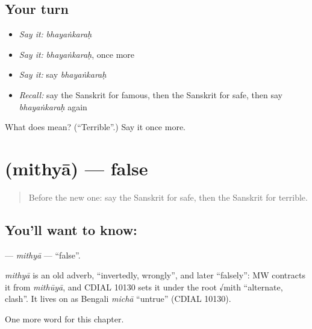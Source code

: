 \subsection*{Your turn}
\begin{itemize}
\raggedright
  \item \emph{Say it:} \emph{bhayaṅkaraḥ}
  \item \emph{Say it:} \emph{bhayaṅkaraḥ}, once more
  \item \emph{Say it:} say \emph{bhayaṅkaraḥ}
  \item \emph{Recall:} say the Sanskrit for famous, then the Sanskrit for safe, then say \emph{bhayaṅkaraḥ} again
\end{itemize}

\begin{tcolorbox}[breakable,colback=teal!4,colframe=teal!35!black,title={Before you move on}]
What does  mean? (\textquotedblleft{}Terrible\textquotedblright{}.) Say it once more.
\end{tcolorbox}
\section[\texorpdfstring{\sk{मिथ्या} (mithyā)}{मिथ्या (mithyā)}]{ (mithyā) — false}

\label{lesson:SA-C128-mithya}



\begin{quote}
Before the new one: say the Sanskrit for safe, then the Sanskrit for terrible.
\end{quote}

\subsection*{You'll want to know: }
\textbf{} — \emph{mithyā} — \textquotedblleft{}false\textquotedblright{}.

\begin{cousinweb}
\emph{mithyā} is an old adverb, \textquotedblleft{}invertedly, wrongly\textquotedblright{}, and later \textquotedblleft{}falsely\textquotedblright{}: MW contracts it from \emph{mithūyā}, and CDIAL 10130 sets it under the root √mith \textquotedblleft{}alternate, clash\textquotedblright{}. It lives on as Bengali \emph{michā} \textquotedblleft{}untrue\textquotedblright{} (CDIAL 10130).
\end{cousinweb}

\begin{grammarlens}[title={What you've built}]
One more word for this chapter.
\end{grammarlens}

